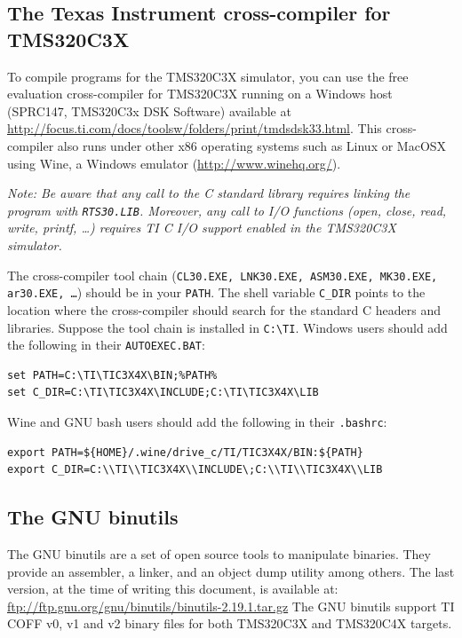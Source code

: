 \subsection{The Texas Instrument cross-compiler for TMS320C3X}
\label{tms320c3x_cross_compiler}

To compile programs for the TMS320C3X simulator, you can use the free evaluation cross-compiler for TMS320C3X running on a Windows host (SPRC147, TMS320C3x DSK Software) available at \url{http://focus.ti.com/docs/toolsw/folders/print/tmdsdsk33.html}.
This cross-compiler also runs under other x86 operating systems such as Linux or MacOSX using Wine, a Windows emulator (\url{http://www.winehq.org/}).

\textit{Note: Be aware that any call to the C standard library requires linking the program with \texttt{RTS30.LIB}.
Moreover, any call to I/O functions (open, close, read, write, printf, \ldots) requires TI C I/O support enabled in the TMS320C3X simulator.}

The cross-compiler tool chain (\texttt{CL30.EXE, LNK30.EXE, ASM30.EXE, MK30.EXE, ar30.EXE, \ldots}) should be in your \texttt{PATH}.
The shell variable \texttt{C\_DIR} points to the location where the cross-compiler should search for the standard C headers and libraries.
Suppose the tool chain is installed in \texttt{C:{\textbackslash}TI}.
Windows users should add the following in their \texttt{AUTOEXEC.BAT}:
\begin{verbatim}
set PATH=C:\TI\TIC3X4X\BIN;%PATH%
set C_DIR=C:\TI\TIC3X4X\INCLUDE;C:\TI\TIC3X4X\LIB
\end{verbatim}
Wine and GNU bash users should add the following in their \texttt{.bashrc}:
\begin{verbatim}
export PATH=${HOME}/.wine/drive_c/TI/TIC3X4X/BIN:${PATH}
export C_DIR=C:\\TI\\TIC3X4X\\INCLUDE\;C:\\TI\\TIC3X4X\\LIB
\end{verbatim}

\subsection{The GNU binutils}

The GNU binutils are a set of open source tools to manipulate binaries. They provide an assembler, a linker, and an object dump utility among others.
The last version, at the time of writing this document, is available at: \url{ftp://ftp.gnu.org/gnu/binutils/binutils-2.19.1.tar.gz}
The GNU binutils support TI COFF v0, v1 and v2 binary files for both TMS320C3X and TMS320C4X targets.


